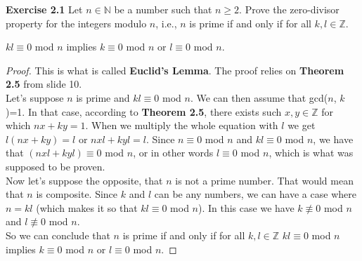 \documentclass{article}
\newcommand{\subtitle}[1]{%
  \posttitle{%
    \par\end{center}
    \begin{center}\LARGE#1\end{center}
    \vskip0.5em}%
}
\begin{document}
\subtitle{Lecture II}
\noindent \textbf{Exercise 2.1} Let $n \in \mathbb{N}$ be a number such that $n \geq 2$. Prove the zero-divisor property for the integers modulo $n$, i.e., $n$ is prime if and only if for all $k, l \in \mathbb{Z}$.
\begin{center}
 $kl \equiv 0$ mod $n$ implies $k \equiv 0$ mod $n$ or $l \equiv 0$ mod $n$.
 \end{center}
\begin{proof}
  This is what is called \textbf{Euclid's Lemma}. The proof relies on \textbf{Theorem 2.5} from slide 10.\\
 Let's suppose $n$ is prime and $kl \equiv 0$ mod $n$. We can then assume that gcd($n$, $k$)=1. In that case, according to \textbf{Theorem 2.5}, there exists such $x, y \in \mathbb{Z}$ for which $nx + ky = 1$. When we multiply the whole equation with $l$ we get $l(nx + ky) = l$ or $nxl + kyl = l$. Since $n \equiv 0$ mod $n$ and $kl \equiv 0$ mod $n$, we have that $(nxl + kyl) \equiv 0$ mod $n$, or in other words $l \equiv 0$ mod $n$, which is what was supposed to be proven.\\
 Now let's suppose the opposite, that $n$ is not a prime number. That would mean that $n$ is composite. Since $k$ and $l$ can be any numbers, we can have a case where $n=kl$ (which makes it so that $kl \equiv 0$ mod $n$). In this case we have $k \not\equiv 0$ mod $n$ and $l \not\equiv 0$ mod $n$. \\
 So we can conclude that $n$ is prime if and only if for all $k, l \in \mathbb{Z}$ $kl \equiv 0$ mod $n$ implies $k \equiv 0$ mod $n$ or $l \equiv 0$ mod $n$.
\end{proof}
\end{document}
